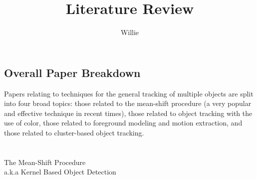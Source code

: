 \documentclass{article}
\begin{document}
\title{Literature Review}
\author{Willie}
\maketitle
\mbox{}






\subsection*{Overall Paper Breakdown}
\vspace{6pt}
Papers relating to techniques for the general tracking of multiple objects are split into four broad topics: those related to the mean-shift procedure (a very popular and effective technique in recent times), those related to object tracking with the use of color, those related to foreground modeling and motion extraction, and those related to cluster-based object tracking. \\
\\
\\
The Mean-Shift Procedure \\
a.k.a Kernel Based Object Detection \\
\\ 
\end{document}

